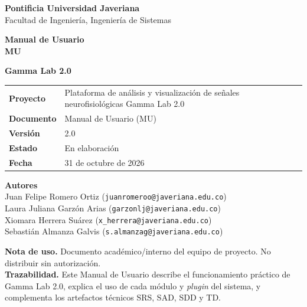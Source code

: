 \documentclass[11pt,a4paper]{article}
\begin{document}
\begin{titlepage}
\thispagestyle{empty}
\begin{center}

    \vspace{0.5cm}
    {\large \textbf{Pontificia Universidad Javeriana}}\\
    {\large Facultad de Ingenier\'ia, Ingenier\'ia de Sistemas}

    \vspace{1.5cm}
    {\Large\bfseries\color{titleblue} Manual de Usuario}\\
    {\large\bfseries MU}

    \vspace{1cm}
    {\Huge\bfseries Gamma Lab 2.0}

    \vspace{2cm}

    \begin{tabular}{@{}ll@{}}
        \textbf{Proyecto} & Plataforma de an\'alisis y visualizaci\'on de se\~nales neurofisiol\'ogicas Gamma Lab 2.0 \\
        \textbf{Documento} & Manual de Usuario (MU) \\
        \textbf{Versi\'on} & 2.0 \\
        \textbf{Estado} & En elaboraci\'on \\
        \textbf{Fecha} & 31 de octubre de 2026 \\
    \end{tabular}

    \vspace{2cm}
    {\bfseries Autores}\\[0.3cm]
    Juan Felipe Romero Ortiz (\texttt{juanromeroo@javeriana.edu.co})\\
    Laura Juliana Garz\'on Arias (\texttt{garzonlj@javeriana.edu.co})\\
    Xiomara Herrera Su\'arez (\texttt{x\_herrera@javeriana.edu.co})\\
    Sebasti\'an Almanza Galvis (\texttt{s.almanzag@javeriana.edu.co})

\end{center}

\vfill

\noindent\textbf{Nota de uso.} Documento acad\'emico/interno del equipo de proyecto. No distribuir sin autorizaci\'on.\\
\noindent\textbf{Trazabilidad.} Este Manual de Usuario describe el funcionamiento pr\'actico de Gamma Lab 2.0, explica el uso de cada m\'odulo y \textit{plugin} del sistema, y complementa los artefactos t\'ecnicos SRS, SAD, SDD y TD.

\end{titlepage}
\end{document}
